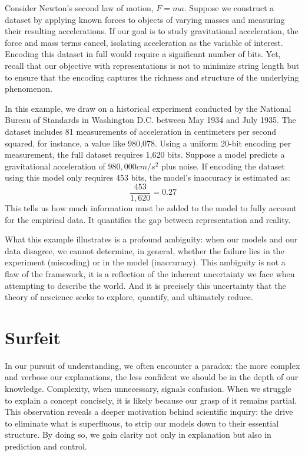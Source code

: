 \begin{example}
\label{ex:introduction:inaccuracy:newton}
Consider Newton's second law of motion, $F = ma$. Suppose we construct a dataset by applying known forces to objects of varying masses and measuring their resulting accelerations. If our goal is to study gravitational acceleration, the force and mass terms cancel, isolating acceleration as the variable of interest. Encoding this dataset in full would require a significant number of bits. Yet, recall that our objective with representations is not to minimize string length but to ensure that the encoding captures the richness and structure of the underlying phenomenon.

In this example, we draw on a historical experiment conducted by the National Bureau of Standards in Washington D.C. between May 1934 and July 1935. The dataset includes 81 measurements of acceleration in centimeters per second squared, for instance, a value like 980,078. Using a uniform 20-bit encoding per measurement, the full dataset requires 1,620 bits. Suppose a model predicts a gravitational acceleration of $980,000 cm/s^2$ plus noise. If encoding the dataset using this model only requires 453 bits, the model's inaccuracy is estimated as:
\[
\frac{453}{1,620} = 0.27
\]
This tells us how much information must be added to the model to fully account for the empirical data. It quantifies the gap between representation and reality.
\end{example}

What this example illustrates is a profound ambiguity: when our models and our data disagree, we cannot determine, in general, whether the failure lies in the experiment (miscoding) or in the model (inaccuracy). This ambiguity is not a flaw of the framework, it is a reflection of the inherent uncertainty we face when attempting to describe the world. And it is precisely this uncertainty that the theory of nescience seeks to explore, quantify, and ultimately reduce.

%
%

\section{Surfeit}
\label{sec:ch1_surfeit}

In our pursuit of understanding, we often encounter a paradox: the more complex and verbose our explanations, the less confident we should be in the depth of our knowledge. Complexity, when unnecessary, signals confusion. When we struggle to explain a concept concisely, it is likely because our grasp of it remains partial. This observation reveals a deeper motivation behind scientific inquiry: the drive to eliminate what is superfluous, to strip our models down to their essential structure. By doing so, we gain clarity not only in explanation but also in prediction and control.

